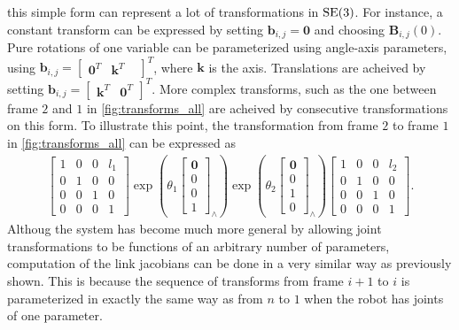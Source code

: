 this simple form can represent a lot of transformations in $\operatorname{SE}(3)$. For instance,
a constant transform can be expressed by setting $\bm{b}_{i,j} = \bm{0}$ and choosing $\bm{B}_{i,j}(0)$.
Pure rotations of one variable can be parameterized using angle-axis parameters, using $\bm{b}_{i,j} =
\begin{bmatrix}\bm{0}^T & \bm{k}^T &\end{bmatrix}^T$, where $\bm{k}$ is the axis. Translations
are acheived by setting $\bm{b}_{i,j} = \begin{bmatrix} \bm{k}^T & \bm{0}^T \end{bmatrix}^T$.
More complex transforms, such as the one between frame $2$ and $1$ in \autoref{fig:transforms_all}
are acheived by consecutive transformations on this form. To illustrate this point, the transformation
from frame $2$ to frame $1$ in \autoref{fig:transforms_all} can be expressed as
\begin{align}
    \begin{bmatrix}1 & 0 & 0 & l_1 \\ 0 & 1 & 0 & 0 \\ 0 & 0 & 1 & 0 \\ 0 & 0 & 0 & 1\end{bmatrix}
    \exp\left(\theta_1\begin{bmatrix}\bm{0} \\ 0 \\ 0 \\ 1\end{bmatrix}_{\wedge}\right)
    \exp\left(\theta_2\begin{bmatrix}\bm{0} \\ 0 \\ 1 \\ 0\end{bmatrix}_{\wedge}\right)
    \begin{bmatrix}1 & 0 & 0 & l_2 \\ 0 & 1 & 0 & 0 \\ 0 & 0 & 1 & 0 \\ 0 & 0 & 0 & 1\end{bmatrix}.
\end{align}
Althoug the system has become much more general by allowing joint transformations to
be functions of an arbitrary number of parameters, computation of the link jacobians can
be done in a very similar way as previously shown. This is because the sequence of
transforms from frame $i+1$ to $i$ is parameterized in exactly the same way as
from $n$ to $1$ when the robot has joints of one parameter.

